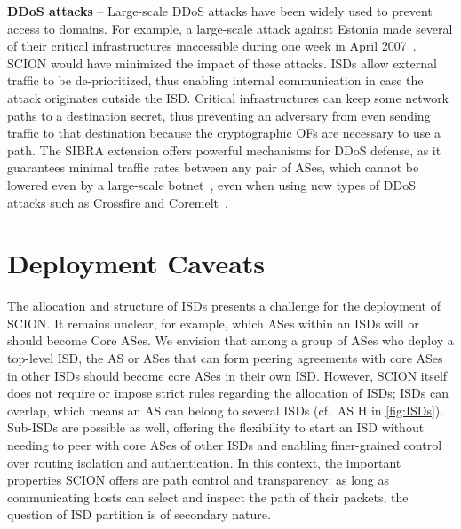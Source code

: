 \documentclass[a4paper]{llncs}
\newcommand\SCION{{\small\textsf{SCION}}\xspace}
\renewcommand\H{\textsf{H}\xspace}
\begin{document}
\textbf{DDoS attacks} -- Large-scale DDoS
attacks have been widely used to prevent access to domains. For example, a
large-scale attack against Estonia made several of their critical
infrastructures inaccessible during one week in April
2007~\cite{estoniajournal}. \SCION would have minimized the impact of these
attacks. ISDs allow external traffic to be de-prioritized, thus enabling
internal communication in case the attack originates outside the ISD. Critical
infrastructures can keep some network paths to a destination secret, thus
preventing an adversary from even sending traffic to that destination because
the cryptographic OFs are necessary to use a path.  The SIBRA extension offers
powerful mechanisms for DDoS defense, as it guarantees minimal traffic rates
between any pair of ASes, which cannot be lowered even by a large-scale
botnet~\cite{BRSPZHKU2015}, even when using new types of DDoS attacks such as
Crossfire and Coremelt~\cite{StuPer2009,KanLeeGli2013}. 








 

\section{Deployment Caveats}

The allocation and structure of ISDs presents a challenge for the deployment of
\SCION. It remains unclear, for example, which ASes within an ISDs will or
should become Core ASes. We envision that among a group of ASes who deploy a
top-level ISD, the AS or ASes that can form peering agreements 
with core ASes in other ISDs should become core ASes in their own ISD.
However, \SCION itself does not require or impose strict rules regarding the
allocation of ISDs; ISDs can overlap, which means an AS can belong to several
ISDs (cf.\ AS \H in \autoref{fig:ISDs}). Sub-ISDs are possible as well, offering
the flexibility to start an ISD without needing to peer with core ASes of other
ISDs and enabling finer-grained control over routing isolation and
authentication.  In this context, the important properties \SCION offers are
path control and transparency: as long as communicating hosts can select and
inspect the path of their packets, the question of ISD partition is of secondary
nature.
\end{document}
